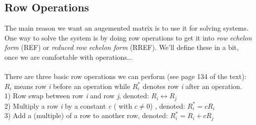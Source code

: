 \documentclass{article}
\begin{document}
\begin{flushleft}
\newpage
\section{Row Operations}
The main reason we want an augemented matrix is to use it for solving systems. One way to solve the system is by doing row operations to get it into \textit{row echelon form} (REF) or \textit{reduced row echelon form} (RREF). We'll define these in a bit, once we are comfortable with operations...\\
\vspace{0.1in}
\hrulefill \\
\noindent
There are three basic row operations we can perform (see page 134 of the text):\\
$R_i$ means row \textit{i} before an operation while $R_i^*$ denotes row \textit{i} after an operation.\\
1) Row swap between row \textit{i} and row \textit{j}, denoted: $R_i \leftrightarrow R_j$\\
2) Multiply a row \textit{i} by a constant \textit{c} ( with $c\neq 0$) , denoted: $R_i^*=c R_i$\\
3) Add a (multiple) of a row to another row, denoted: $R_i^*= R_i+c R_j$\\
\hrulefill \\


\end{flushleft}
\end{document}
